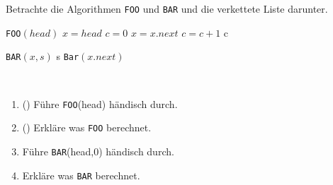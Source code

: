 \documentclass{uebung_cs}
\begin{document}
\begin{aufgabe}
	Betrachte die Algorithmen \texttt{FOO} und \texttt{BAR} und die verkettete Liste darunter.
	\begin{center}
	\begin{minipage}{0.45\textwidth}
		\begin{algorithmic}
			\STATE \texttt{FOO}$(head)$
			\STATE $x = head$
			\STATE $c = 0$
				\STATE $x = x.next$
				\STATE $c = c + 1$
			\ENDWHILE
			\RETURN c
		\end{algorithmic}
	\end{minipage}%
		\hfill
	\begin{minipage}{0.45\textwidth}
		\begin{algorithmic}
			\STATE \texttt{BAR}$(x,s)$
			\IF{$x == null$}
				\RETURN s
			\ELSE
				\RETURN \texttt{Bar}$(x.next)$
			\ENDIF
		\end{algorithmic}
	\end{minipage}\\%
	\end{center}
	
	

	\begin{enumerate}
		\item (\warmup) Führe \texttt{FOO}(head) händisch durch.
		\item (\warmup) Erkläre was \texttt{FOO} berechnet.
		\item Führe \texttt{BAR}(head,0) händisch durch.
		\item Erkläre was \texttt{BAR} berechnet.
	\end{enumerate}
\end{aufgabe}
\end{document}
